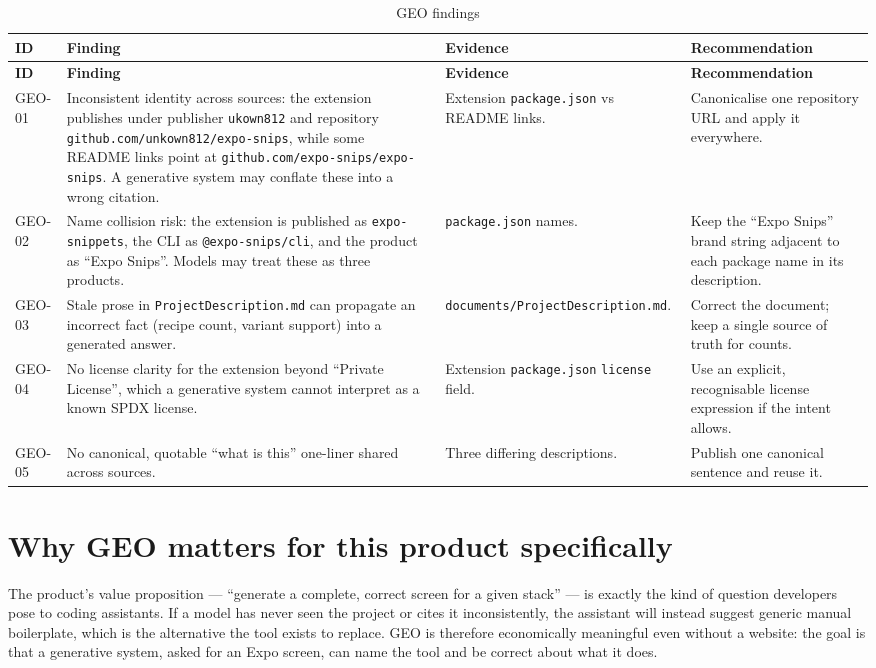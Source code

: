 \begin{longtable}{@{}L{1.5cm}L{4.6cm}L{3.4cm}L{4.7cm}@{}}
\caption{GEO findings}\\
\toprule
\textbf{ID} & \textbf{Finding} & \textbf{Evidence} & \textbf{Recommendation} \\
\midrule
\endfirsthead
\toprule
\textbf{ID} & \textbf{Finding} & \textbf{Evidence} & \textbf{Recommendation} \\
\midrule
\endhead
GEO-01 & Inconsistent identity across sources: the extension publishes under
publisher \texttt{ukown812} and repository \texttt{github.com/unkown812/expo-snips},
while some README links point at \texttt{github.com/expo-snips/expo-snips}. A
generative system may conflate these into a wrong citation. & Extension
\texttt{package.json} vs README links. & Canonicalise one repository URL and apply
it everywhere. \\
GEO-02 & Name collision risk: the extension is published as \texttt{expo-snippets},
the CLI as \texttt{@expo-snips/cli}, and the product as ``Expo Snips''. Models may
treat these as three products. & \texttt{package.json} names. & Keep the
``Expo Snips'' brand string adjacent to each package name in its description. \\
GEO-03 & Stale prose in \texttt{ProjectDescription.md} can propagate an
incorrect fact (recipe count, variant support) into a generated answer. &
\texttt{documents/ProjectDescription.md}. & Correct the document; keep a single
source of truth for counts. \\
GEO-04 & No license clarity for the extension beyond ``Private License'', which a
generative system cannot interpret as a known SPDX license. & Extension
\texttt{package.json} \texttt{license} field. & Use an explicit, recognisable
license expression if the intent allows. \\
GEO-05 & No canonical, quotable ``what is this'' one-liner shared across sources. &
Three differing descriptions. & Publish one canonical sentence and reuse it. \\
\bottomrule
\end{longtable}

\section{Why GEO matters for this product specifically}

The product's value proposition --- ``generate a complete, correct screen for a
given stack'' --- is exactly the kind of question developers pose to coding
assistants. If a model has never seen the project or cites it inconsistently, the
assistant will instead suggest generic manual boilerplate, which is the
alternative the tool exists to replace. GEO is therefore economically meaningful
even without a website: the goal is that a generative system, asked for an Expo
screen, can name the tool and be correct about what it does.

